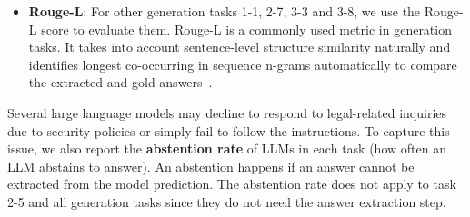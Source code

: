 \begin{itemize}
    \item \textbf{Rouge-L}: For other generation tasks 1-1, 2-7, 3-3 and 3-8, we use the Rouge-L score to evaluate them. Rouge-L is a commonly used metric in generation tasks. It takes into account sentence-level structure similarity naturally and identifies longest co-occurring in sequence n-grams automatically to compare the extracted and gold answers~\cite{lin2004rouge}.
\end{itemize}
Several large language models may decline to respond to legal-related inquiries due to security policies or simply fail to follow the instructions. To capture this issue, we also report the \textbf{abstention rate} of LLMs in each task (how often an LLM abstains to answer). An abstention happens if an answer cannot be extracted from the model prediction. The abstention rate does not apply to task 2-5 and all generation tasks since they do not need the answer extraction step.

